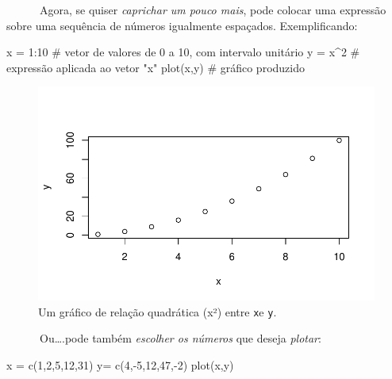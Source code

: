 \documentclass[
  letterpaper,
  DIV=11,
  numbers=noendperiod]{scrreprt}
\newenvironment{Shaded}{\begin{snugshade}}{\end{snugshade}}
\newcommand{\CommentTok}[1]{\textcolor[rgb]{0.37,0.37,0.37}{#1}}
\newcommand{\DecValTok}[1]{\textcolor[rgb]{0.68,0.00,0.00}{#1}}
\newcommand{\FunctionTok}[1]{\textcolor[rgb]{0.28,0.35,0.67}{#1}}
\newcommand{\NormalTok}[1]{\textcolor[rgb]{0.00,0.23,0.31}{#1}}
\newcommand{\OtherTok}[1]{\textcolor[rgb]{0.00,0.23,0.31}{#1}}
\newcommand{\SpecialCharTok}[1]{\textcolor[rgb]{0.37,0.37,0.37}{#1}}
\begin{document}
~~~~~~Agora, se quiser \emph{caprichar um pouco mais}, pode colocar uma
expressão sobre uma sequência de números igualmente espaçados.
Exemplificando:

\begin{Shaded}
\begin{Highlighting}[]
\NormalTok{x }\OtherTok{=} \DecValTok{1}\SpecialCharTok{:}\DecValTok{10} \CommentTok{\# vetor de valores de 0 a 10,  com intervalo unitário}
\NormalTok{y }\OtherTok{=}\NormalTok{ x}\SpecialCharTok{\^{}}\DecValTok{2} \CommentTok{\# expressão aplicada ao vetor "x"}
\FunctionTok{plot}\NormalTok{(x,y) }\CommentTok{\# gráfico produzido}
\end{Highlighting}
\end{Shaded}

\begin{figure}[H]

{\centering \includegraphics{basico_files/figure-pdf/unnamed-chunk-4-1.pdf}

}

\caption{Um gráfico de relação quadrática (x²) entre \texttt{x}e
\texttt{y}.}

\end{figure}%

~~~~~~Ou\ldots.pode também \emph{escolher os números} que deseja
\emph{plotar}:

\begin{Shaded}
\begin{Highlighting}[]
\NormalTok{x }\OtherTok{=} \FunctionTok{c}\NormalTok{(}\DecValTok{1}\NormalTok{,}\DecValTok{2}\NormalTok{,}\DecValTok{5}\NormalTok{,}\DecValTok{12}\NormalTok{,}\DecValTok{31}\NormalTok{)}
\NormalTok{y}\OtherTok{=} \FunctionTok{c}\NormalTok{(}\DecValTok{4}\NormalTok{,}\SpecialCharTok{{-}}\DecValTok{5}\NormalTok{,}\DecValTok{12}\NormalTok{,}\DecValTok{47}\NormalTok{,}\SpecialCharTok{{-}}\DecValTok{2}\NormalTok{)}
\FunctionTok{plot}\NormalTok{(x,y)}
\end{Highlighting}
\end{Shaded}
\end{document}
